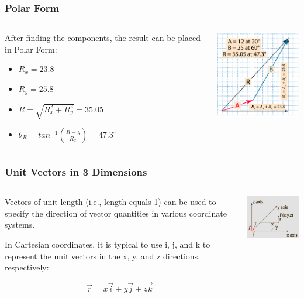 \documentclass{beamer}
\begin{document}
\begin{frame}\frametitle{Polar Form}
\begin{columns}
\begin{column}{6cm}
After finding the components, the result can be placed in Polar Form:
\begin{itemize}
\item $R_x = 23.8$
\item $R_y = 25.8$
\item $R = \sqrt{R_x^2 + R_y^2} = 35.05$
\item $\theta_R = tan^{-1} (\frac{R-y}{R_x}) = 47.3^{\circ}$
\end{itemize}
\end{column}
\begin{column}{5cm}

\begin{center}
\includegraphics[width=4.8cm]{fig/vec4a.png}
\end{center}
\end{column}
\end{columns}
\end{frame}

\begin{frame}\frametitle{Unit Vectors in 3 Dimensions}
\begin{columns}
\begin{column}{6cm}
Vectors of unit length (i.e., length equals 1) can be used to specify the direction of vector quantities in various coordinate systems.

In Cartesian coordinates, it is typical to use i, j, and k to represent the unit vectors in the x, y, and z directions, respectively: 

\begin{equation}
\vec{r} = x \vec{i} + y \vec{j} + z \vec{k}
\end{equation}
\end{column}
\begin{column}{5cm}

\begin{center}
\includegraphics[width=4.8cm]{fig/uvec.jpg}
\end{center}
\end{column}
\end{columns}
\end{frame}
\end{document}
